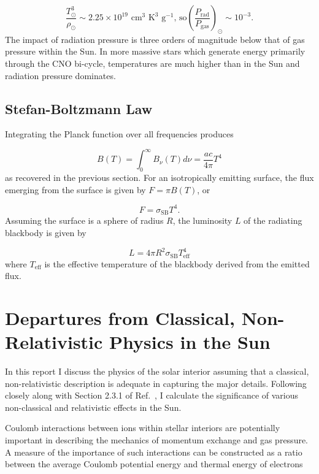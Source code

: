 \documentclass[12pt]{article}
\newcommand{\bigparenthesis}[1]{\left(#1\right)}
\begin{document}
\begin{equation}
    \frac{T_\odot^3}{\rho_\odot} \sim 2.25 \times 10^{19} \text{ cm}^{3} \text{ K}^{3} \text{ g}^{-1}\text{, so} \bigparenthesis{\frac{P_\mathrm{rad}}{P_\mathrm{gas}}}_\odot \sim 10^{-3}.
\end{equation}
%
The impact of radiation pressure is three orders of magnitude below that of gas pressure within the Sun. In more massive stars which generate energy primarily through the CNO bi-cycle, temperatures are much higher than in the Sun and radiation pressure dominates.

\subsection{Stefan-Boltzmann Law}
Integrating the Planck function over all frequencies produces

\begin{equation}
    B(T) = \int_0^{\infty} B_\nu (T) d\nu = \frac{ac}{4\pi}T^4
\end{equation}
%
as recovered in the previous section. For an isotropically emitting surface, the flux emerging from the surface is given by $F = \pi B(T)$, or

\begin{equation}
    F = \sigma_\mathrm{SB} T^4.
\end{equation}
%
Assuming the surface is a sphere of radius $R$, the luminosity $L$ of the radiating blackbody is given by

\begin{equation}
    L = 4\pi R^2 \sigma_\mathrm{SB} T_\mathrm{eff}^4
\end{equation}
%
where $T_\mathrm{eff}$ is the effective temperature of the blackbody derived from the emitted flux.

\pagebreak

\setcounter{equation}{0}
\section{Departures from Classical, Non-Relativistic Physics in the Sun} \label{ap:departures}
In this report I discuss the physics of the solar interior assuming that a classical, non-relativistic description is adequate in capturing the major details. Following closely along with Section 2.3.1 of Ref.~\cite{Christensen_Dalsgaard_2021}, I calculate the significance of various non-classical and relativistic effects in the Sun.

Coulomb interactions between ions within stellar interiors are potentially important in describing the mechanics of momentum exchange and gas pressure. A measure of the importance of such interactions can be constructed as a ratio between the average Coulomb potential energy and thermal energy of electrons
\end{document}

